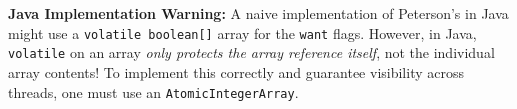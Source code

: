 \begin{important}
    \textbf{Java Implementation Warning:} A naive implementation of Peterson's in Java might use a \texttt{volatile boolean[]} array for the \texttt{want} flags. However, in Java, \texttt{volatile} on an array \textit{only protects the array reference itself}, not the individual array contents! To implement this correctly and guarantee visibility across threads, one must use an \texttt{AtomicIntegerArray}.
\end{important}